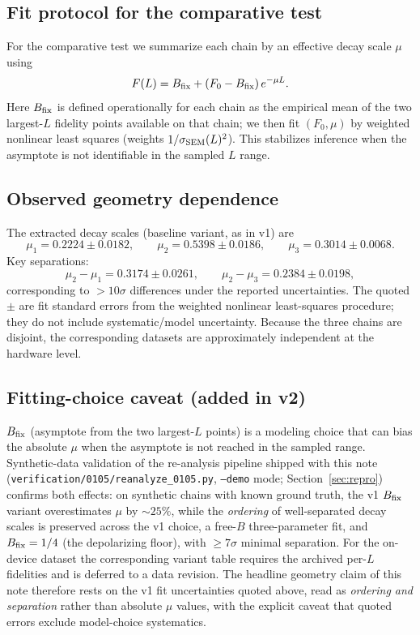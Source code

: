 \documentclass[11pt]{article}
\begin{document}
\subsection{Fit protocol for the comparative test}
For the comparative test we summarize each chain by an effective decay scale
$\mu$ using
\begin{equation}
F(L) = B_{\rm fix} + (F_0 - B_{\rm fix})\, e^{-\mu L}.
\label{eq:fit}
\end{equation}
Here $B_{\rm fix}$ is defined operationally for each chain as the empirical
mean of the two largest-$L$ fidelity points available on that chain; we then
fit $(F_0, \mu)$ by weighted nonlinear least squares (weights
$1/\sigma_{\rm SEM}(L)^2$). This stabilizes inference when the asymptote is
not identifiable in the sampled $L$ range.

\subsection{Observed geometry dependence}
The extracted decay scales (baseline variant, as in v1) are
\[
\mu_1 = 0.2224 \pm 0.0182,\qquad
\mu_2 = 0.5398 \pm 0.0186,\qquad
\mu_3 = 0.3014 \pm 0.0068.
\]
Key separations:
\[
\mu_2 - \mu_1 = 0.3174 \pm 0.0261,\qquad
\mu_2 - \mu_3 = 0.2384 \pm 0.0198,
\]
corresponding to $>10\sigma$ differences under the reported uncertainties.
The quoted $\pm$ are fit standard errors from the weighted nonlinear
least-squares procedure; they do not include systematic/model uncertainty.
Because the three chains are disjoint, the corresponding datasets are
approximately independent at the hardware level.

\subsection{Fitting-choice caveat (added in v2)}
$B_{\rm fix}$ (asymptote from the two largest-$L$ points) is a modeling
choice that can bias the absolute $\mu$ when the asymptote is not reached in
the sampled range. Synthetic-data validation of the re-analysis pipeline
shipped with this note (\texttt{verification/0105/reanalyze\_0105.py},
\texttt{--demo} mode; Section~\ref{sec:repro}) confirms both effects: on
synthetic chains with known ground truth, the v1 $B_{\rm fix}$ variant
overestimates $\mu$ by $\sim 25\%$, while the \emph{ordering} of
well-separated decay scales is preserved across the v1 choice, a free-$B$
three-parameter fit, and $B_{\rm fix}=1/4$ (the depolarizing floor), with
$\ge 7\sigma$ minimal separation. For the on-device dataset the
corresponding variant table requires the archived per-$L$ fidelities and is
deferred to a data revision. The headline geometry claim of this note
therefore rests on the v1 fit uncertainties quoted above, read as
\emph{ordering and separation} rather than absolute $\mu$ values, with the
explicit caveat that quoted errors exclude model-choice systematics.
\end{document}
